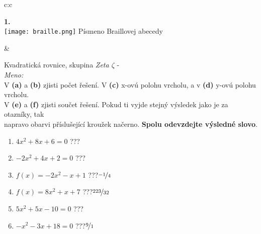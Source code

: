 \documentclass[10pt]{report}
\begin{document}
\begin{tabular}{c:c}
\begin{minipage}[c][99mm][t]{0.49\linewidth}
\begin{center}
\begin{minipage}{0.20\linewidth}
\begin{center}
{\Huge\bfseries 1.} \\[2mm]
\texttt{[image: braille.png]}
{\small Písmeno Braillovej abecedy}
\end{center}
\end{minipage}
\end{center}
\end{minipage}
&
\begin{minipage}[c][99mm][t]{0.49\linewidth}
\begin{center}
\vspace{7mm}
{\huge Kvadratická rovnice, skupina \textit{Zeta $\zeta$} -}\\[4.5mm]
\textit{Meno:}\phantom{xxxxxxxxxxxxxxxxxxxxxxxxxxxxxxxxxxxxxxxxxxxxxxxxxxxxxxxxxxxxxxxxx}\\[3.5mm]
V \textbf{(a)} a \textbf{(b)} zjisti počet řešení. V \textbf{(c)} x-ovú polohu vrcholu, a v \textbf{(d)} y-ovú polohu vrcholu.\\V \textbf{(e)} a \textbf{(f)} zjisti součet řešení. Pokud ti vyjde stejný výsledek jako je za otazníky, tak\\napravo obarvi příslušející kroužek načerno. \textbf{Spolu odevzdejte výsledné slovo}.\\[3mm]
\begin{minipage}{0.77\linewidth}
\begin{center}
\begin{varwidth}{\textwidth}
\begin{enumerate}
\large
\item $4x^2+8x+6=0$\quad \dotfill\; ???\;\dotfill {}
\item $-2x^2+4x+2=0$\quad \dotfill\; ???\;\dotfill {}
\item $f(x)=-2x^2-x+1$\quad \dotfill\; ???\;\dotfill \quad $\nicefrac{-1}{4}$
\item $f(x)=8x^2+x+7$\quad \dotfill\; ???\;\dotfill \quad $\nicefrac{223}{32}$
\item $5x^2+5x-10=0$\quad \dotfill\; ???\;\dotfill {}
\item $-x^2-3x+18=0$\quad \dotfill\; ???\;\dotfill \quad $\nicefrac{9}{1}$
\end{enumerate}
\end{varwidth}
\end{center}
\end{minipage}
\begin{minipage}{0.20\linewidth}

\end{minipage}
\end{center}
\end{minipage}
\end{tabular}
\end{document}
